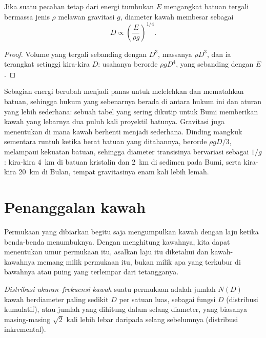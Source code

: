 \begin{proposition}\label{prop:b3:planetary-interiors-surfaces:scaling}
Jika suatu pecahan tetap dari energi tumbukan $E$ mengangkat batuan tergali
bermassa jenis $\rho$ melawan gravitasi $g$, diameter kawah membesar sebagai
\[
  D \propto \left(\frac{E}{\rho g}\right)^{1/4} .
\]
\end{proposition}

\begin{proof}
Volume yang tergali sebanding dengan $D^3$, massanya $\rho D^3$, dan ia
terangkat setinggi kira-kira $D$: usahanya berorde $\rho g D^4$, yang
sebanding dengan $E$.
\end{proof}

Sebagian energi berubah menjadi panas untuk melelehkan dan mematahkan batuan, sehingga
hukum yang sebenarnya berada di antara hukum ini dan aturan yang lebih sederhana: sebuah tabel
yang sering dikutip untuk Bumi memberikan kawah yang lebarnya dua puluh kali proyektil batunya.
Gravitasi juga menentukan di mana kawah berhenti menjadi sederhana. Dinding
mangkuk sementara runtuh ketika berat batuan yang ditahannya,
berorde $\rho g D/3$, melampaui kekuatan batuan, sehingga diameter transisinya
bervariasi sebagai $1/g$: kira-kira \qty{4}{km} di batuan kristalin dan
\qty{2}{km} di sedimen pada Bumi, serta kira-kira \qty{20}{km} di
Bulan, tempat gravitasinya enam kali lebih lemah.

\section{Penanggalan kawah}\label{sec:b3:planetary-interiors-surfaces:dating}

Permukaan yang dibiarkan begitu saja mengumpulkan kawah dengan laju ketika benda-benda
menumbuknya. Dengan menghitung kawahnya, kita dapat menentukan umur permukaan itu,
asalkan laju itu diketahui dan kawah-kawahnya memang milik permukaan itu, bukan milik apa yang
terkubur di bawahnya atau puing yang terlempar dari tetangganya.

\begin{definition}\label{def:b3:planetary-interiors-surfaces:sfd}
\emph{Distribusi ukuran--frekuensi kawah}
suatu permukaan adalah jumlah $N(D)$ kawah berdiameter paling sedikit $D$ per
satuan luas, sebagai fungsi $D$ (distribusi kumulatif), atau jumlah yang
dihitung dalam selang diameter, yang biasanya masing-masing $\sqrt2$ kali lebih
lebar daripada selang sebelumnya (distribusi inkremental).
\end{definition}

